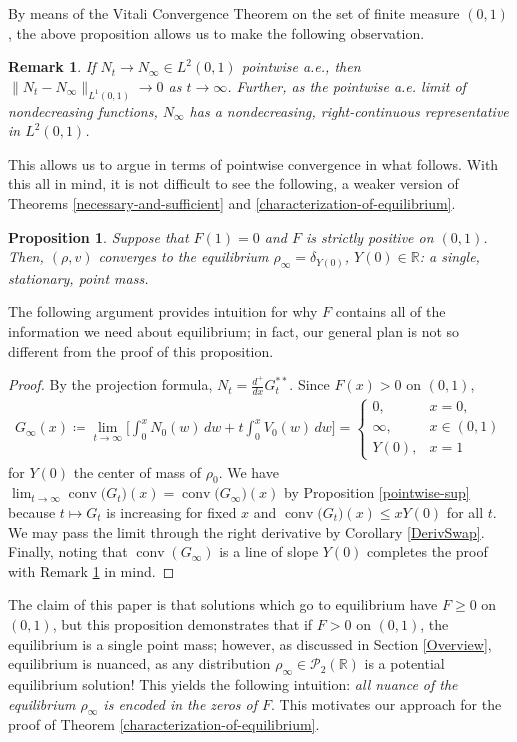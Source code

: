 \documentclass[10pt,a4paper]{amsart}
\newtheorem{prop}[thm]{Proposition}
\newtheorem{remark}[thm]{Remark}
\numberwithin{equation}{section}
\DeclareMathOperator{\conv}{conv}
\begin{document}
    By means of the Vitali Convergence Theorem on the set of finite measure $(0,1)$, the above proposition allows us to make the following observation. 
    \begin{remark}\label{pointwise-to-L1}
        If $N_t\to N_\infty\in L^2(0,1)$ pointwise a.e., then $\|N_t-N_\infty\|_{L^1(0,1)}\to0$ as $t\to\infty$. Further, as the pointwise a.e. limit of nondecreasing functions, $N_\infty$ has a nondecreasing, right-continuous representative in $L^2(0,1)$. 
    \end{remark}
    This allows us to argue in terms of pointwise convergence in what follows. With this all in mind, it is not difficult to see the following, a weaker version of Theorems \ref{necessary-and-sufficient} and \ref{characterization-of-equilibrium}. 
    \begin{prop}\label{motivation-prop}
        Suppose that $F(1)=0$ and $F$ is strictly positive on $(0,1)$. Then, $(\rho,v)$ converges to the equilibrium $\rho_\infty=\delta_{Y(0)}$, $Y(0)\in\mathbb{R}$: a single, stationary, point mass. 
    \end{prop}
    The following argument provides intuition for why $F$ contains all of the information we need about equilibrium; in fact, our general plan is not so different from the proof of this proposition. 
    \begin{proof}
        By the projection formula, $N_t=\frac{d^+}{dx}G_t^{**}$. Since $F(x)>0$ on $(0,1)$,  
        \begin{align*}
            G_\infty(x)\coloneq\lim_{t\to\infty}\Big[\int_0^x N_0(w) \, dw+t\int_0^x V_0(w) \, dw\Big]=\begin{cases}
                0, &x=0,
                \\
                \infty, &x\in(0,1)
                \\
                Y(0), &x=1
            \end{cases}
        \end{align*}
        for $Y(0)$ the center of mass of $\rho_0$. We have $\lim_{t\to\infty}\conv\big(G_t\big)(x)=\conv\big(G_\infty\big)(x)$ by Proposition \ref{pointwise-sup} because $t\mapsto G_t$ is increasing for fixed $x$ and $\conv\big(G_t\big)(x)\leq xY(0)$ for all $t$. We may pass the limit through the right derivative by Corollary \ref{DerivSwap}. Finally, noting that $\conv(G_\infty)$ is a line of slope $Y(0)$ completes the proof with Remark \ref{pointwise-to-L1} in mind.
    \end{proof}
    The claim of this paper is that solutions which go to equilibrium have $F\geq0$ on $(0,1)$, but this proposition demonstrates that if $F>0$ on $(0,1)$, the equilibrium is a single point mass; however, as discussed in Section \ref{Overview}, equilibrium is nuanced, as any distribution $\rho_\infty\in\mathcal{P}_2(\mathbb{R})$ is a potential equilibrium solution! This yields the following intuition: \textit{all nuance of the equilibrium $\rho_\infty$ is encoded in the zeros of $F$}. This motivates our approach for the proof of Theorem \ref{characterization-of-equilibrium}.
\end{document}
